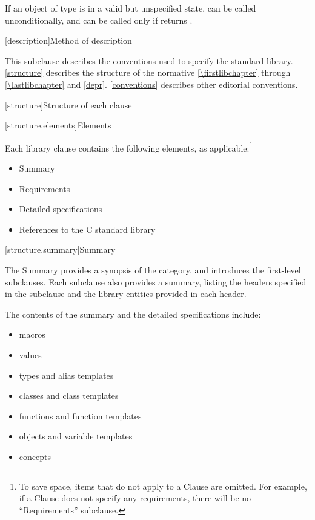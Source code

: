 \begin{example}
If an object  of type  is in a
valid but unspecified state,  can be called unconditionally,
and  can be called only if  returns
.
\end{example}

[description]{Method of description}

\pnum
This subclause describes the conventions used to specify the \Cpp{} standard
library. \ref{structure} describes the structure of the normative
\ref{\firstlibchapter} through \ref{\lastlibchapter} and
\ref{depr}. \ref{conventions} describes other editorial conventions.

[structure]{Structure of each clause}

[structure.elements]{Elements}

\pnum
Each library clause contains the following elements, as applicable:\footnote{To
save space, items that do not apply to a Clause are omitted.
For example, if a Clause does not specify any requirements,
there will be no ``Requirements'' subclause.}

\begin{itemize}
\item Summary
\item Requirements
\item Detailed specifications
\item References to the C standard library
\end{itemize}

[structure.summary]{Summary}

\pnum
The Summary provides a synopsis of the category, and introduces the first-level subclauses.
Each subclause also provides a summary, listing the headers specified in the
subclause and the library entities provided in each header.

\pnum
The contents of the summary and the detailed specifications include:

\begin{itemize}
\item macros
\item values
\item types and alias templates
\item classes and class templates
\item functions and function templates
\item objects and variable templates
\item concepts
\end{itemize}

